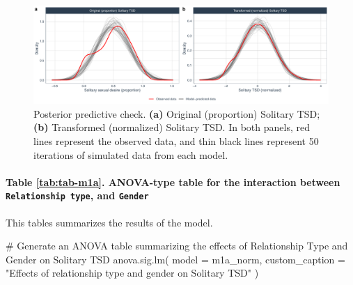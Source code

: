 \documentclass[
  bookmarksnumbered]{article}
\newenvironment{Shaded}{\begin{snugshade}}{\end{snugshade}}
\newcommand{\AttributeTok}[1]{\textcolor[rgb]{0.80,0.80,0.80}{#1}}
\newcommand{\CommentTok}[1]{\textcolor[rgb]{0.50,0.62,0.50}{#1}}
\newcommand{\FunctionTok}[1]{\textcolor[rgb]{0.94,0.94,0.56}{#1}}
\newcommand{\NormalTok}[1]{\textcolor[rgb]{0.80,0.80,0.80}{#1}}
\newcommand{\StringTok}[1]{\textcolor[rgb]{0.80,0.58,0.58}{#1}}
\begin{document}
\begin{figure}
\centering
\includegraphics{Sexual_Desire_Arousal_files/figure-latex/ppc-m1a-1.pdf}
\caption{\label{fig:ppc-m1a}Posterior predictive check. \textbf{(a)} Original (proportion) Solitary TSD; \textbf{(b)} Transformed (normalized) Solitary TSD. In both panels, red lines represent the observed data, and thin black lines represent 50 iterations of simulated data from each model.}
\end{figure}

\paragraph{\texorpdfstring{Table \ref{tab:tab-m1a}. ANOVA-type table for the interaction between \texttt{Relationship\ type}, and \texttt{Gender}}{Table \ref{tab:tab-m1a}. ANOVA-type table for the interaction between Relationship type, and Gender}}\label{table-reftabtab-m1a.-anova-type-table-for-the-interaction-between-relationship-type-and-gender}

This tables summarizes the results of the model.

\begin{Shaded}
\begin{Highlighting}[]
\CommentTok{\# Generate an ANOVA table summarizing the effects of Relationship Type and Gender on Solitary TSD}
\FunctionTok{anova.sig.lm}\NormalTok{(}
  \AttributeTok{model =}\NormalTok{ m1a\_norm,}
  \AttributeTok{custom\_caption =} \StringTok{"Effects of relationship type and gender on Solitary TSD"}
\NormalTok{)}
\end{Highlighting}
\end{Shaded}
\end{document}
